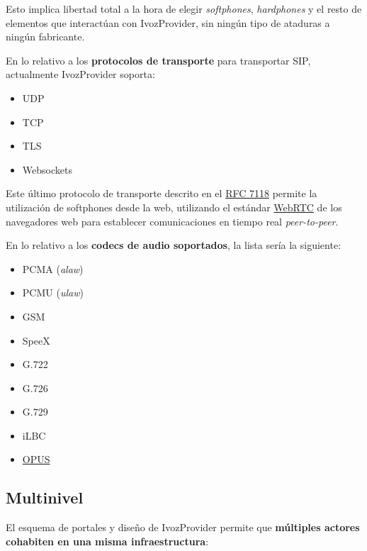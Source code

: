 \documentclass[letterpaper,10pt,spanish]{sphinxmanual}
\begin{document}
Esto implica libertad total a la hora de elegir \emph{softphones}, \emph{hardphones} y el resto de elementos que interactúan con IvozProvider, sin ningún tipo de ataduras a ningún fabricante.

En lo relativo a los \textbf{protocolos de transporte} para transportar SIP, actualmente IvozProvider soporta:
\begin{itemize}
\item {} 
UDP

\item {} 
TCP

\item {} 
TLS

\item {} 
Websockets

\end{itemize}

Este último protocolo de transporte descrito en el \href{https://tools.ietf.org/html/rfc7118}{RFC 7118} permite la utilización de softphones desde la web, utilizando el estándar \href{https://webrtc.org/}{WebRTC} de los navegadores web para establecer comunicaciones en tiempo real \emph{peer-to-peer}.

En lo relativo a los \textbf{codecs de audio soportados}, la lista sería la siguiente:
\begin{itemize}
\item {} 
PCMA (\emph{alaw})

\item {} 
PCMU (\emph{ulaw})

\item {} 
GSM

\item {} 
SpeeX

\item {} 
G.722

\item {} 
G.726

\item {} 
G.729

\item {} 
iLBC

\item {} 
\href{http://opus-codec.org/}{OPUS}

\end{itemize}


\subsection{Multinivel}
\label{intro/what_is_ivozprovider:multilevel}
El esquema de portales y diseño de IvozProvider permite que \textbf{múltiples actores cohabiten en una misma infraestructura}:
\end{document}
